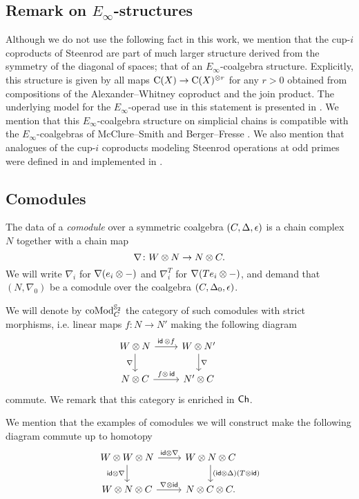 \subsection{Remark on $E_\infty$-structures}

Although we do not use the following fact in this work, we mention that the cup-$i$ coproducts of Steenrod are part of much larger structure derived from the symmetry of the diagonal of spaces; that of an $E_\infty$-coalgebra structure.
Explicitly, this structure is given by all maps $\operatorname{C}(X) \to \operatorname{C}(X)^{\otimes r}$ for any $r > 0$ obtained from compositions of the Alexander--Whitney coproduct and the join product.
The underlying model for the $E_\infty$-operad use in this statement is presented in \cite{medina2020prop1, medina2021prop2}.
We mention that this $E_\infty$-coalgebra structure on simplicial chains is compatible with the $E_\infty$-coalgebras of McClure--Smith \cite{mcclure2003multivariable} and Berger--Fresse \cite{berger2004combinatorial}.
We also mention that analogues of the cup-$i$ coproducts modeling Steenrod operations at odd primes were defined in \cite{medina2021may_st} and implemented in \cite{medina2021comch}.

\subsection{Comodules}

The data of a \textit{comodule} over a symmetric coalgebra $(C, \operatorname{\Delta}, \operatorname{\epsilon})$ is a chain complex $N$ together with a chain map
\[
\nabla \colon W \otimes N \to N \otimes C.
\]
We will write $\nabla_i$ for $\nabla(e_i \otimes -)$ and $\nabla_i^T$ for $\nabla(Te_i \otimes -)$, and demand that $(N, \nabla_0)$ be a comodule over the coalgebra $(C, \operatorname{\Delta}_0, \operatorname{\epsilon})$.

We will denote by $\operatorname{coMod}_C^{\mathbb{S}_2}$ the category of such comodules with strict morphisms, i.e. linear maps $f \colon N \to N'$ making the following diagram
\[
\begin{tikzcd}
	W \ot N \arrow[d, "\nabla"'] \arrow[r, "\id\, \ot f"] &
	W \ot N' \arrow[d, "\nabla"] & \\
	N \ot C \arrow[r, "f \ot\, \id"] &
	N' \ot C
\end{tikzcd}
\]
commute.
We remark that this category is enriched in $\mathsf{Ch}$.

We mention that the examples of comodules we will construct make the following diagram commute up to homotopy
\[
\begin{tikzcd}
	W \ot W \ot N \arrow[r, "\id \ot \nabla"] \arrow[d, "\id \ot \nabla"'] &
	W \ot N \ot C \arrow[d, "(\id \ot \copr)(T \ot \id)"] \\
	W \ot N \ot C \arrow[r, "\nabla \ot \id"] &
	N \ot C \ot C.
\end{tikzcd}
\]


